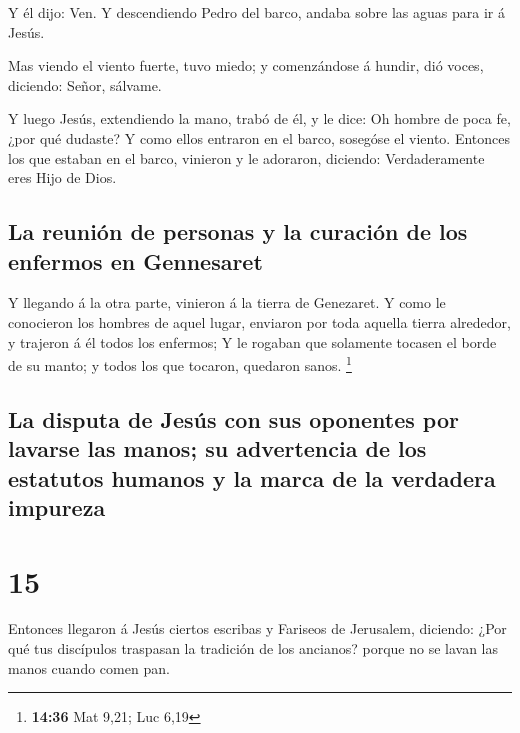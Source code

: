  Y él dijo: Ven. Y descendiendo Pedro del barco, andaba
sobre las aguas para ir á Jesús.

 Mas viendo el viento fuerte, tuvo miedo; y comenzándose á
hundir, dió voces, diciendo: Señor, sálvame.

 Y luego Jesús, extendiendo la mano, trabó de él, y le
dice: Oh hombre de poca fe, ¿por qué dudaste?  Y como ellos
entraron en el barco, sosegóse el viento.  Entonces los que
estaban en el barco, vinieron y le adoraron, diciendo: Verdaderamente
eres Hijo de Dios.

\hypertarget{la-reuniuxf3n-de-personas-y-la-curaciuxf3n-de-los-enfermos-en-gennesaret}{%
\subsection{La reunión de personas y la curación de los enfermos en
Gennesaret}\label{la-reuniuxf3n-de-personas-y-la-curaciuxf3n-de-los-enfermos-en-gennesaret}}

 Y llegando á la otra parte, vinieron á la tierra de
Genezaret.  Y como le conocieron los hombres de aquel
lugar, enviaron por toda aquella tierra alrededor, y trajeron á él todos
los enfermos;  Y le rogaban que solamente tocasen el borde
de su manto; y todos los que tocaron, quedaron sanos. \footnote{\textbf{14:36}
  Mat 9,21; Luc 6,19}

\hypertarget{la-disputa-de-jesuxfas-con-sus-oponentes-por-lavarse-las-manos-su-advertencia-de-los-estatutos-humanos-y-la-marca-de-la-verdadera-impureza}{%
\subsection{La disputa de Jesús con sus oponentes por lavarse las manos;
su advertencia de los estatutos humanos y la marca de la verdadera
impureza}\label{la-disputa-de-jesuxfas-con-sus-oponentes-por-lavarse-las-manos-su-advertencia-de-los-estatutos-humanos-y-la-marca-de-la-verdadera-impureza}}

\hypertarget{section-14}{%
\section{15}\label{section-14}}

 Entonces llegaron á Jesús ciertos escribas y Fariseos de
Jerusalem, diciendo:  ¿Por qué tus discípulos traspasan la
tradición de los ancianos? porque no se lavan las manos cuando comen
pan.

